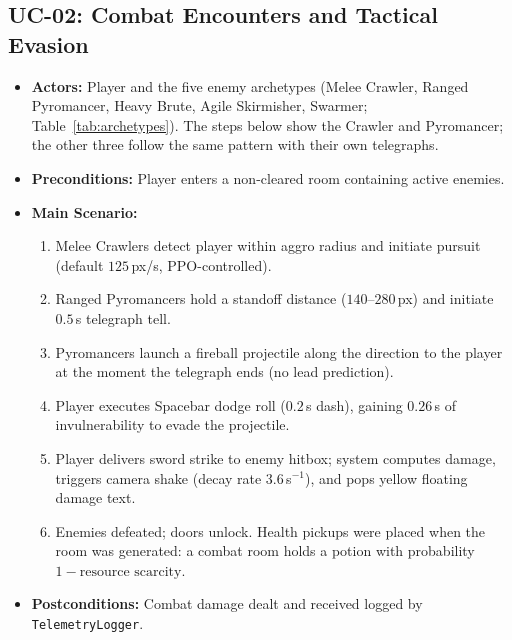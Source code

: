 \subsection{UC-02: Combat Encounters and Tactical Evasion}
\begin{itemize}
    \item \textbf{Actors:} Player and the five enemy archetypes (Melee Crawler, Ranged Pyromancer, Heavy Brute, Agile Skirmisher, Swarmer; Table~\ref{tab:archetypes}). The steps below show the Crawler and Pyromancer; the other three follow the same pattern with their own telegraphs.
    \item \textbf{Preconditions:} Player enters a non-cleared room containing active enemies.
    \item \textbf{Main Scenario:}
    \begin{enumerate}
        \item Melee Crawlers detect player within aggro radius and initiate pursuit (default $125$\,px/s, PPO-controlled).
        \item Ranged Pyromancers hold a standoff distance ($140$--$280$\,px) and initiate $0.5$\,s telegraph tell.
        \item Pyromancers launch a fireball projectile along the direction to the player at the moment the telegraph ends (no lead prediction).
        \item Player executes Spacebar dodge roll ($0.2$\,s dash), gaining $0.26$\,s of invulnerability to evade the projectile.
        \item Player delivers sword strike to enemy hitbox; system computes damage, triggers camera shake (decay rate $3.6$\,s$^{-1}$), and pops yellow floating damage text.
        \item Enemies defeated; doors unlock. Health pickups were placed when the room was generated: a combat room holds a potion with probability $1 - \text{resource scarcity}$.
    \end{enumerate}
    \item \textbf{Postconditions:} Combat damage dealt and received logged by \texttt{TelemetryLogger}.
\end{itemize}

